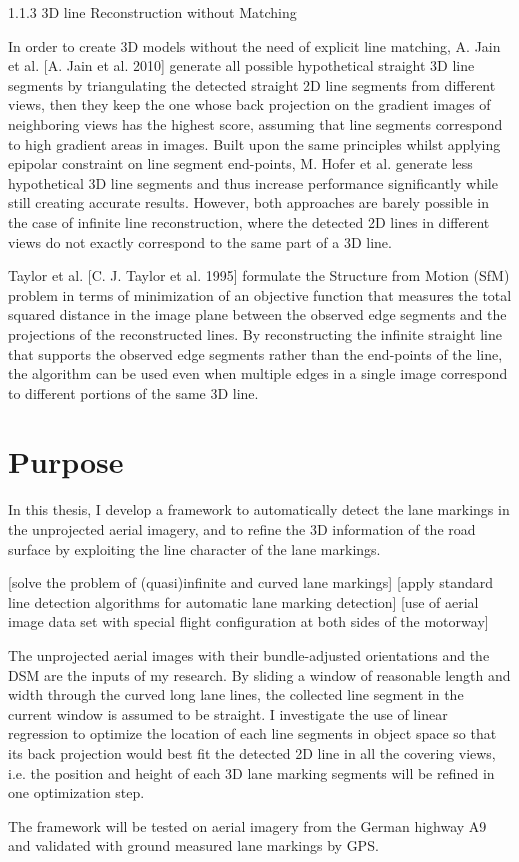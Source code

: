 1.1.3 3D line Reconstruction without Matching

In order to create 3D models without the need of explicit line matching, A. Jain et al. [A. Jain et al. 2010] generate all possible hypothetical straight 3D line segments by triangulating the detected straight 2D line segments from different views, then they keep the one whose back projection on the gradient images of neighboring views has the highest score, assuming that line segments correspond to high gradient areas in images. Built upon the same principles whilst applying epipolar constraint on line segment end-points, M. Hofer et al. generate less hypothetical 3D line segments and thus increase performance significantly while still creating accurate results. However, both approaches are barely possible in the case of infinite line reconstruction, where the detected 2D lines in different views do not exactly correspond to the same part of a  3D line.

Taylor et al. [C. J. Taylor et al. 1995] formulate the Structure from Motion (SfM) problem in terms of minimization of an objective function that measures the total squared distance in the image plane between the observed edge segments and the projections of the reconstructed lines. By reconstructing the infinite straight line that supports the observed edge segments rather than the end-points of the line, the algorithm can be used even when multiple edges in a single image correspond to different portions of the same 3D line.

\section{Purpose}

In this thesis, I develop a framework to automatically detect the lane markings in the unprojected aerial imagery, and to refine the 3D information of the road surface by exploiting the line character of the lane markings.

[solve the problem of (quasi)infinite and curved lane markings]
[apply standard line detection algorithms for automatic lane marking detection]
[use of aerial image data set with special flight configuration at both sides of the motorway]

The unprojected aerial images with their bundle-adjusted orientations and the DSM are the inputs of my research. By sliding a window of reasonable length and width through the curved long lane lines, the collected line segment in the current window is assumed to be straight. I investigate the use of linear regression to optimize the location of each line segments in object space so that its back projection would best fit the detected 2D line in all the covering views, i.e. the position and height of each 3D lane marking segments will be refined in one optimization step.

The framework will be tested on aerial imagery from the German highway A9 and validated with ground measured lane markings by GPS.
